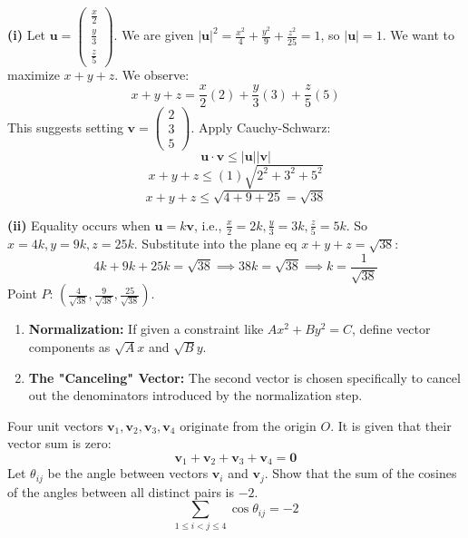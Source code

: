 \begin{solution}
\textbf{(i)} Let $\mathbf{u} = \begin{pmatrix} \frac{x}{2} \\ \frac{y}{3} \\ \frac{z}{5} \end{pmatrix}$. We are given $|\mathbf{u}|^2 = \frac{x^2}{4} + \frac{y^2}{9} + \frac{z^2}{25} = 1$, so $|\mathbf{u}|=1$.
We want to maximize $x+y+z$. We observe:
\[ x+y+z = \frac{x}{2}(2) + \frac{y}{3}(3) + \frac{z}{5}(5) \]
This suggests setting $\mathbf{v} = \begin{pmatrix} 2 \\ 3 \\ 5 \end{pmatrix}$.
Apply Cauchy-Schwarz:
\[ \mathbf{u} \cdot \mathbf{v} \le |\mathbf{u}| |\mathbf{v}| \]
\[ x + y + z \le (1) \sqrt{2^2 + 3^2 + 5^2} \]
\[ x + y + z \le \sqrt{4 + 9 + 25} = \sqrt{38} \]

\textbf{(ii)} Equality occurs when $\mathbf{u} = k\mathbf{v}$, i.e., $\frac{x}{2} = 2k, \frac{y}{3} = 3k, \frac{z}{5} = 5k$.
So $x=4k, y=9k, z=25k$.
Substitute into the plane eq $x+y+z = \sqrt{38}$:
\[ 4k + 9k + 25k = \sqrt{38} \implies 38k = \sqrt{38} \implies k = \frac{1}{\sqrt{38}} \]
Point $P$: $\left( \frac{4}{\sqrt{38}}, \frac{9}{\sqrt{38}}, \frac{25}{\sqrt{38}} \right)$.
\end{solution}

\begin{takeaways}
\begin{enumerate}
    \item \textbf{Normalization:} If given a constraint like $Ax^2 + By^2 = C$, define vector components as $\sqrt{A}x$ and $\sqrt{B}y$.
    \item \textbf{The "Canceling" Vector:} The second vector is chosen specifically to cancel out the denominators introduced by the normalization step.
\end{enumerate}
\end{takeaways}

\begin{problem}
Four unit vectors $\mathbf{v}_1, \mathbf{v}_2, \mathbf{v}_3, \mathbf{v}_4$ originate from the origin $O$.
It is given that their vector sum is zero:
\[ \mathbf{v}_1 + \mathbf{v}_2 + \mathbf{v}_3 + \mathbf{v}_4 = \mathbf{0} \]
Let $\theta_{ij}$ be the angle between vectors $\mathbf{v}_i$ and $\mathbf{v}_j$.
Show that the sum of the cosines of the angles between all distinct pairs is $-2$.
\[ \sum_{1 \le i < j \le 4} \cos \theta_{ij} = -2 \]

\begin{center}
\end{center}
\end{problem}

